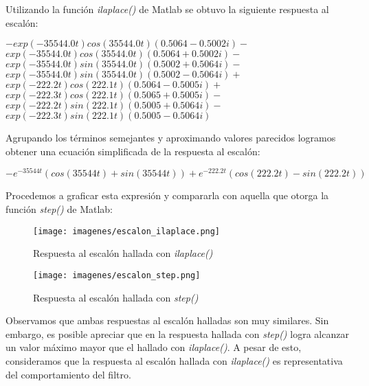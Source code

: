 \documentclass[12pt, titlepage]{article}
\begin{document}
    
    Utilizando la función \emph{ilaplace()} de Matlab se obtuvo la siguiente respuesta al escalón: 
    \begin{center}
     $- exp(-35544.0t)cos(35544.0t)(0.5064 - 0.5002i) -$ \\ $exp(-35544.0t)cos(35544.0t)(0.5064 + 0.5002i) -$ \\ $exp(-35544.0t)sin(35544.0t)(0.5002 + 0.5064i) -$ \\ $exp(-35544.0t)sin(35544.0t)(0.5002 - 0.5064i) +$ \\ $exp(-222.2t)cos(222.1t)(0.5064 - 0.5005i) +$ \\ $exp(-222.3t)cos(222.1t)(0.5065 + 0.5005i) -$\\ $exp(-222.2t)sin(222.1t)(0.5005 + 0.5064i) -$\\ $exp(-222.3t)sin(222.1t)(0.5005 - 0.5064i)$     
    \end{center}
    
    Agrupando los términos semejantes y aproximando valores parecidos logramos obtener una ecuación simplificada de la respuesta al escalón:
    \begin{center}
        $-e^{-35544t}(cos(35544t)+sin(35544t)) + e^{-222.2t}(cos(222.2t) - sin(222.2t))$
    \end{center}
        
    
    Procedemos a graficar esta expresión y compararla con aquella que otorga la función \emph{step()} de Matlab:

    \newpage
    
    \begin{figure}[!htb]
     \texttt{[image: imagenes/escalon\_ilaplace.png]}
     \centering
     \caption{Respuesta al escalón hallada con \emph{ilaplace()}}
    \end{figure}
    
    \begin{figure}[!htb]
     \texttt{[image: imagenes/escalon\_step.png]}
     \centering
     \caption{Respuesta al escalón hallada con \emph{step()}}
    \end{figure}

    \newpage

    Observamos que ambas respuestas al escalón halladas son muy similares. Sin embargo, es posible apreciar que en la respuesta hallada con \emph{step()} logra alcanzar un valor máximo mayor que el hallado con \emph{ilaplace()}. A pesar de esto, consideramos que la respuesta al escalón hallada con \emph{ilaplace()} es representativa del comportamiento del filtro.
\end{document}
